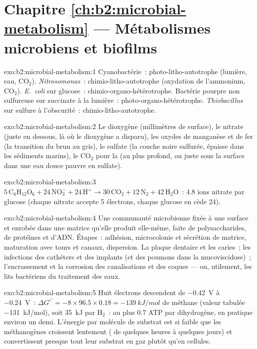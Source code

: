 \section*{Chapitre \ref{ch:b2:microbial-metabolism} --- Métabolismes microbiens et biofilms}

\begin{solution}{exo:b2:microbial-metabolism:1}
Cyanobactérie~: photo-litho-autotrophe (lumière, eau, $\mathrm{CO_2}$).
\emph{Nitrosomonas}~: chimio-litho-autotrophe (oxydation de l'ammonium,
$\mathrm{CO_2}$). \emph{E.~coli} sur glucose~: chimio-organo-hétérotrophe.
Bactérie pourpre non sulfureuse sur succinate à la lumière~:
photo-organo-hétérotrophe. \emph{Thiobacillus} sur sulfure à l'obscurité~:
chimio-litho-autotrophe.
\end{solution}

\begin{solution}{exo:b2:microbial-metabolism:2}
Le dioxygène (millimètres de surface), le nitrate (juste en dessous, là
où le dioxygène a disparu), les oxydes de manganèse et de fer (la
transition du brun au gris), le sulfate (la couche noire sulfurée,
épaisse dans les sédiments marins), le
$\mathrm{CO_2}$ pour la  (au plus profond, ou juste sous la
surface dans une eau douce pauvre en sulfate).
\end{solution}

\begin{solution}{exo:b2:microbial-metabolism:3}
$5\,\mathrm{C_6H_{12}O_6} + 24\,\mathrm{NO_3^-} + 24\,\mathrm{H^+}
\to 30\,\mathrm{CO_2} + 12\,\mathrm{N_2} + 42\,\mathrm{H_2O}$~: 4.8
ions nitrate par glucose (chaque nitrate accepte 5 électrons, chaque
glucose en cède 24).
\end{solution}

\begin{solution}{exo:b2:microbial-metabolism:4}
Une communauté microbienne fixée à une surface et enrobée dans une
matrice qu'elle produit elle-même, faite de polysaccharides, de
protéines et d'ADN. Étapes~: adhésion, microcolonie et sécrétion de
matrice, maturation avec tours et canaux, dispersion. La plaque
dentaire et les caries~; les infections des cathéters et des implants
(et des poumons dans la mucoviscidose)~; l'encrassement et la corrosion
des canalisations et des coques --- ou, utilement, les lits bactériens
du traitement des eaux.
\end{solution}

\begin{solution}{exo:b2:microbial-metabolism:5}
Huit électrons descendent de \qty{-0.42}{V} à \qty{-0.24}{V}~:
$\Delta G^{\circ\prime} = -8\times 96.5\times 0.18 =
\qty{-139}{kJ/mol}$ de méthane (valeur tabulée \qty{-131}{kJ/mol}),
soit \qty{35}{kJ} par $\mathrm{H_2}$~: au plus 0.7 ATP par dihydrogène,
en pratique environ un demi. L'énergie par molécule de substrat est si
faible que les méthanogènes croissent lentement (
de quelques heures à quelques jours) et convertissent presque tout leur
substrat en gaz plutôt qu'en cellules.
\end{solution}

